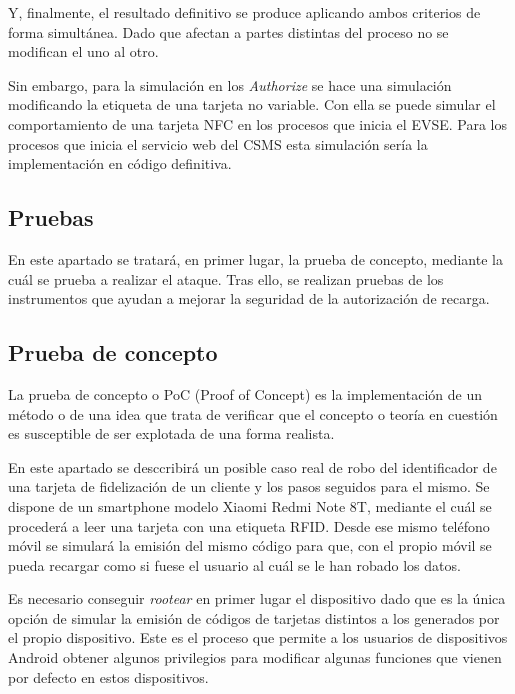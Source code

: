 \documentclass[12pt,a4paper,onecolumn,oneside]{report}
\begin{document}
Y, finalmente, el resultado definitivo se produce aplicando ambos criterios de forma simultánea. Dado que afectan a partes distintas del proceso no se modifican el uno al otro.

Sin embargo, para la simulación en los \textit{Authorize} se hace una simulación modificando la etiqueta de una tarjeta no variable. Con ella se puede simular el comportamiento de una tarjeta NFC en los procesos que inicia el EVSE. Para los procesos que inicia el servicio web del CSMS esta simulación sería la implementación en código definitiva.







\subsection{Pruebas}

En este apartado se tratará, en primer lugar, la prueba de concepto, mediante la cuál se prueba a realizar el ataque. Tras ello, se realizan pruebas de los instrumentos que ayudan a mejorar la seguridad de la autorización de recarga.

\subsection{Prueba de concepto}
\label{Prueba de concepto}

La prueba de concepto o PoC (Proof of Concept) es la implementación de un método o de una idea que trata de verificar que el concepto o teoría en cuestión es susceptible de ser explotada de una forma realista.

En este apartado se desccribirá un posible caso real de robo del identificador de una tarjeta de fidelización de un cliente y los pasos seguidos para el mismo. Se dispone de un smartphone modelo Xiaomi Redmi Note 8T, mediante el cuál se procederá a leer una tarjeta con una etiqueta RFID. Desde ese mismo teléfono móvil se simulará la emisión del mismo código para que, con el propio móvil se pueda recargar como si fuese el usuario al cuál se le han robado los datos.

Es necesario conseguir \textit{rootear} en primer lugar el dispositivo dado que es la única opción de simular la emisión de códigos de tarjetas distintos a los generados por el propio dispositivo. Este es el proceso que permite a los usuarios de dispositivos Android obtener algunos privilegios para modificar algunas funciones que vienen por defecto en estos dispositivos.
\end{document}
